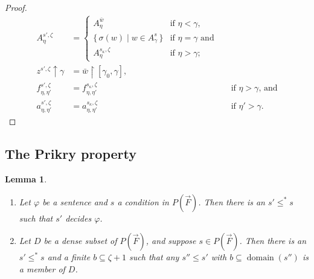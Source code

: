 \documentclass[
twoside,
]{article}
\newtheorem{lemma}[theorem]{Lemma}
\theoremstyle{definition}
\theoremstyle{remark}
\newcommand{\scutdown}{{\uparrow}}
\renewcommand{\phi}{\varphi}
\newcommand{\set}[1]{\{\,#1\,\}}
\newcommand{\restrict}{{\upharpoonright}}
\DeclareMathOperator{\domain}{domain}
\begin{document}
\begin{proof}{}
  \begin{align*}
    A^{s',\zeta}_{\eta}&=
    \begin{cases}
      A^{\bar w}_{\eta}&\text{if $\eta<\gamma$},\\
      \set{\sigma(w)\mid w\in A^{s}_{\gamma}}&\text{if
        $\eta=\gamma$ and}
      \\
      A^{s_\kappa,\zeta}_{\eta}&\text{if $\eta>\gamma$};
    \end{cases}
    \\
    z^{s',\zeta}\scutdown\gamma &= \bar w\restrict[\gamma_0,\gamma],
    \\
    f^{s',\zeta}_{\eta,\eta'}&=f^{s_\kappa,\zeta}_{\eta,\eta'}&&\text{if
                                                     $\eta>\gamma$, and}
    \\
    a^{s',\zeta
}_{\eta,\eta'}&= a^{s_\kappa,\zeta}_{\eta,\eta'}&&\text{if $\eta'>\gamma$.}
  \end{align*}
\end{proof}

\subsection{The Prikry property}
\label{sec:prikry}
\begin{lemma}\label{thm:prikry}
  \begin{enumerate}
  \item\label{item:Prikrythm-decide} Let $\phi$ be a sentence and $s$ a condition in $P(\vec F)$.
    Then there is an $s'\leq^{*}s$ such that $s'$ decides $\phi$.
  \item\label{item:Prikrythm-inD} Let $D$ be a dense subset of $P(\vec F)$, and suppose $s\in
    P(\vec F)$. Then there is an $s'\leq^{*}s$ and a finite
    $b\subseteq\zeta+1$ such that any $s''\leq s'$ with
    $b\subseteq\domain(s'')$ is a member of $D$.
  \end{enumerate}
\end{lemma}
\end{document}
